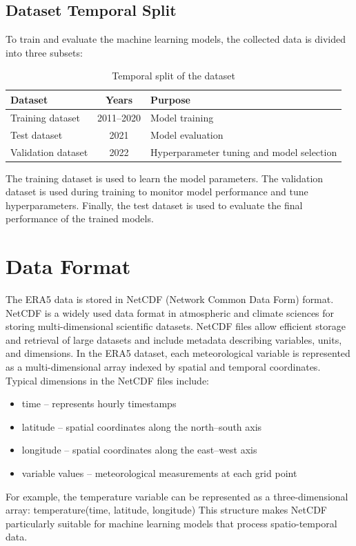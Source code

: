 \subsection{Dataset Temporal Split}

To train and evaluate the machine learning models, the collected data is divided into three subsets:

\begin{table}[h]
\centering
\begin{tabular}{|l|c|l|}
\hline
\textbf{Dataset} & \textbf{Years} & \textbf{Purpose} \\
\hline
Training dataset & 2011--2020 & Model training \\
Test dataset & 2021 & Model evaluation \\
Validation dataset & 2022 & Hyperparameter tuning and model selection \\
\hline
\end{tabular}
\caption{Temporal split of the dataset}
\end{table}

The training dataset is used to learn the model parameters. The validation dataset is used during training to monitor model performance and tune hyperparameters. Finally, the test dataset is used to evaluate the final performance of the trained models.
\section{Data Format}
The ERA5 data is stored in NetCDF (Network Common Data Form) format. NetCDF is a widely used data format in atmospheric and climate sciences for storing multi-dimensional scientific datasets.
NetCDF files allow efficient storage and retrieval of large datasets and include metadata describing variables, units, and dimensions.
In the ERA5 dataset, each meteorological variable is represented as a multi-dimensional array indexed by spatial and temporal coordinates.
Typical dimensions in the NetCDF files include:
\begin{itemize}
    \item time – represents hourly timestamps
    \item latitude – spatial coordinates along the north–south axis
    \item longitude – spatial coordinates along the east–west axis
    \item variable values – meteorological measurements at each grid point
\end{itemize}

For example, the temperature variable can be represented as a three-dimensional array:
temperature(time, latitude, longitude)
This structure makes NetCDF particularly suitable for machine learning models that process spatio-temporal data.
